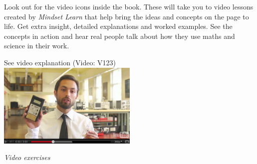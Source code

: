 {\Large

Look out for the video icons inside the book. These will take you to video lessons created by \textit{Mindset
Learn} that help bring the ideas and concepts on the page to life. Get extra insight, detailed
explanations and worked examples. See the concepts in action and hear real people talk about how they
use maths and science in their work. \par

\begin{center}
See video explanation  (Video: V123)\\
\includegraphics[width=0.5\textwidth]{title_images/veritasiumvideo.png}
\end{center}\par

}
\vspace{0.5cm}
{\normalfont\sffamily\fontsize{22}\normalfont\itshape Video exercises} \par

